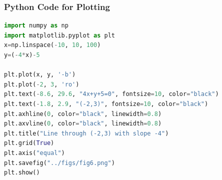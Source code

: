 \documentclass{beamer}
\theoremstyle{remark}
\numberwithin{equation}{section}
\begin{document}
\begin{frame}[fragile]
\frametitle{Python Code for Plotting}
\begin{lstlisting}[language=Python]
import numpy as np
import matplotlib.pyplot as plt
x=np.linspace(-10, 10, 100)
y=(-4*x)-5

plt.plot(x, y, '-b')
plt.plot(-2, 3, 'ro')
plt.text(-8.6, 29.6, "4x+y+5=0", fontsize=10, color="black")
plt.text(-1.8, 2.9, "(-2,3)", fontsize=10, color="black")
plt.axhline(0, color="black", linewidth=0.8)
plt.axvline(0, color="black", linewidth=0.8)
plt.title("Line through (-2,3) with slope -4")
plt.grid(True)
plt.axis("equal")
plt.savefig("../figs/fig6.png")
plt.show()
\end{lstlisting}
\end{frame}
\end{document}
